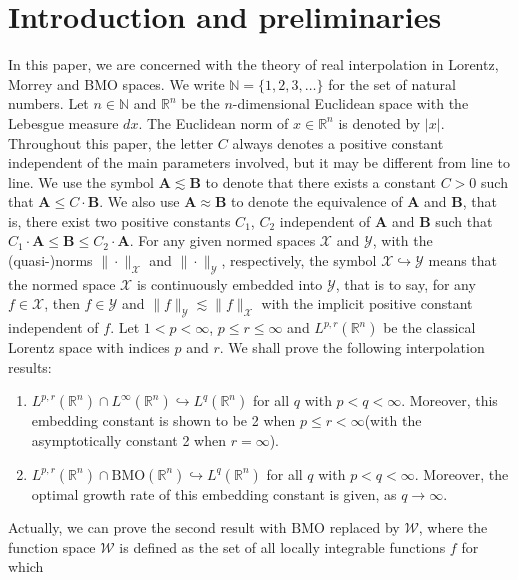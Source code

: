 \documentclass{birkjour}
\theoremstyle{definition}
\theoremstyle{remark}
\numberwithin{equation}{section}
\begin{document}
\section{Introduction and preliminaries}
In this paper, we are concerned with the theory of real interpolation in Lorentz, Morrey and BMO spaces. We write $\mathbb{N}=\{1,2,3,\dots\}$ for the set of natural numbers. Let $n\in \mathbb{N}$ and $\mathbb R^n$ be the $n$-dimensional Euclidean space with the Lebesgue measure $dx$. The Euclidean norm of $x\in\mathbb R^n$ is denoted by $|x|$. Throughout this paper, the letter $C$ always denotes a positive constant independent of the main parameters involved, but it may be different from line to line. We use the symbol $\mathbf{A}\lesssim \mathbf{B}$ to denote that there exists a constant $C>0$ such that $\mathbf{A}\leq C\cdot\mathbf{B}$. We also use $\mathbf{A}\approx \mathbf{B}$ to denote the equivalence of $\mathbf{A}$ and $\mathbf{B}$, that is, there exist two positive constants $C_1$, $C_2$ independent of $\mathbf{A}$ and $\mathbf{B}$ such that $C_1\cdot \mathbf{A}\leq \mathbf{B}\leq C_2\cdot\mathbf{A}$. For any given normed spaces $\mathcal{X}$ and $\mathcal{Y}$, with the (quasi-)norms $\|\cdot\|_{\mathcal{X}}$ and $\|\cdot\|_{\mathcal{Y}}$, respectively, the symbol $\mathcal{X}\hookrightarrow\mathcal{Y}$ means that the normed space $\mathcal{X}$ is continuously embedded into $\mathcal{Y}$, that is to say, for any $f\in \mathcal{X}$, then $f\in \mathcal{Y}$ and $\|f\|_{\mathcal{Y}}\lesssim\|f\|_{\mathcal{X}}$ with the implicit positive constant independent of $f$. Let $1<p<\infty$, $p\leq r\leq\infty$ and $L^{p,r}(\mathbb R^n)$ be the classical Lorentz space with indices $p$ and $r$. We shall prove the following interpolation results:
\begin{enumerate}
  \item $L^{p,r}(\mathbb R^n)\cap L^{\infty}(\mathbb R^n)\hookrightarrow L^q(\mathbb R^n)$ for all $q$ with $p<q<\infty$. Moreover, this embedding constant is shown to be 2 when $p\leq r<\infty$(with the asymptotically constant 2 when $r=\infty$).
  \item $L^{p,r}(\mathbb R^n)\cap \mathrm{BMO}(\mathbb R^n)\hookrightarrow L^q(\mathbb R^n)$ for all $q$ with $p<q<\infty$. Moreover, the optimal growth rate of this embedding constant is given, as $q\to\infty$.
\end{enumerate}
Actually, we can prove the second result with $\mathrm{BMO}$ replaced by $\mathcal{W}$, where the function space $\mathcal{W}$ is defined as the set of all locally integrable functions $f$ for which
\end{document}
